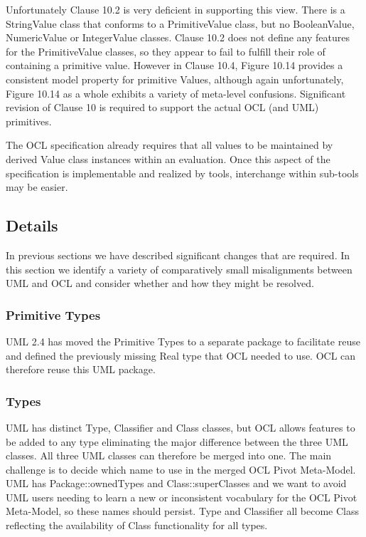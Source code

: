 \documentclass{eceasst}
\begin{document}
Unfortunately Clause 10.2 is very deficient in supporting this view. There is a StringValue class that conforms to a PrimitiveValue class, but no BooleanValue, NumericValue or IntegerValue classes. Clause 10.2  does not define any features for the PrimitiveValue classes, so they appear to fail to fulfill their role of containing a primitive value. However in Clause 10.4, Figure 10.14 provides a consistent model property for primitive Values, although again unfortunately, Figure 10.14 as a whole exhibits a variety of meta-level confusions. Significant revision of Clause 10 is required to support the actual OCL (and UML) primitives.

The OCL specification already requires that all values to be maintained by derived Value class instances within an evaluation. Once this aspect of the specification is implementable and realized by tools, interchange within sub-tools may be easier. 

\subsection{Details}

In previous sections we have described significant changes that are required. In this section we identify a variety of comparatively small misalignments between UML and OCL and consider whether and how they might be resolved.

\subsubsection{Primitive Types}

UML 2.4 has moved the Primitive Types to a separate package to facilitate reuse and defined the previously missing Real type that OCL needed to use. OCL can therefore reuse this UML package.

\subsubsection{Types}\label{Type}

UML has distinct Type, Classifier and Class classes, but OCL allows features to be added to any type eliminating the major difference between the three UML classes. All three UML classes can therefore be merged into one. The main challenge is to decide which name to use in the merged OCL Pivot Meta-Model. UML has Package::ownedTypes and Class::superClasses and we want to avoid UML users needing to learn a new or inconsistent vocabulary for the OCL Pivot Meta-Model, so these names should persist. Type and Classifier all become Class reflecting the availability of Class functionality for all types.
\end{document}
